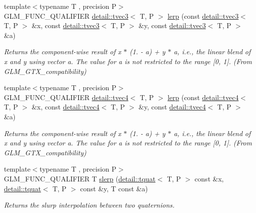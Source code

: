 \begin{DoxyCompactItemize}
{\footnotesize template$<$typename T , precision P$>$ }\\G\+L\+M\+\_\+\+F\+U\+N\+C\+\_\+\+Q\+U\+A\+L\+I\+F\+I\+ER \hyperlink{structglm_1_1detail_1_1tvec3}{detail\+::tvec3}$<$ T, P $>$ \hyperlink{group__gtx__compatibility_gaa07546447a0138988802c82cf38aa53d}{lerp} (const \hyperlink{structglm_1_1detail_1_1tvec3}{detail\+::tvec3}$<$ T, P $>$ \&x, const \hyperlink{structglm_1_1detail_1_1tvec3}{detail\+::tvec3}$<$ T, P $>$ \&y, const \hyperlink{structglm_1_1detail_1_1tvec3}{detail\+::tvec3}$<$ T, P $>$ \&a)
\begin{DoxyCompactList}\small\item\em Returns the component-\/wise result of x $\ast$ (1. -\/ a) + y $\ast$ a, i.\+e., the linear blend of x and y using vector a. The value for a is not restricted to the range \mbox{[}0, 1\mbox{]}. (From G\+L\+M\+\_\+\+G\+T\+X\+\_\+compatibility) \end{DoxyCompactList}\item 
{\footnotesize template$<$typename T , precision P$>$ }\\G\+L\+M\+\_\+\+F\+U\+N\+C\+\_\+\+Q\+U\+A\+L\+I\+F\+I\+ER \hyperlink{structglm_1_1detail_1_1tvec4}{detail\+::tvec4}$<$ T, P $>$ \hyperlink{group__gtx__compatibility_ga48f60aeee275f1848cfc60a85fde96f2}{lerp} (const \hyperlink{structglm_1_1detail_1_1tvec4}{detail\+::tvec4}$<$ T, P $>$ \&x, const \hyperlink{structglm_1_1detail_1_1tvec4}{detail\+::tvec4}$<$ T, P $>$ \&y, const \hyperlink{structglm_1_1detail_1_1tvec4}{detail\+::tvec4}$<$ T, P $>$ \&a)
\begin{DoxyCompactList}\small\item\em Returns the component-\/wise result of x $\ast$ (1. -\/ a) + y $\ast$ a, i.\+e., the linear blend of x and y using vector a. The value for a is not restricted to the range \mbox{[}0, 1\mbox{]}. (From G\+L\+M\+\_\+\+G\+T\+X\+\_\+compatibility) \end{DoxyCompactList}\item 
{\footnotesize template$<$typename T , precision P$>$ }\\G\+L\+M\+\_\+\+F\+U\+N\+C\+\_\+\+Q\+U\+A\+L\+I\+F\+I\+ER T \hyperlink{group__gtx__compatibility_gaa47df8c302c9b42c813da3f658f90e1a}{slerp} (\hyperlink{structglm_1_1detail_1_1tquat}{detail\+::tquat}$<$ T, P $>$ const \&x, \hyperlink{structglm_1_1detail_1_1tquat}{detail\+::tquat}$<$ T, P $>$ const \&y, T const \&a)
\begin{DoxyCompactList}\small\item\em Returns the slurp interpolation between two quaternions. \end{DoxyCompactList}\item 

\end{DoxyCompactItemize}
